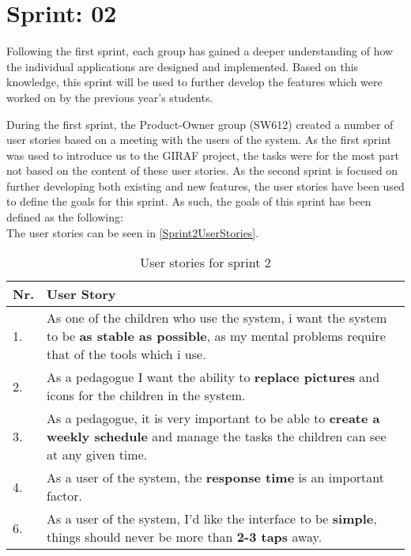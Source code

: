 \chapter{Sprint: 02}
Following the first sprint, each group has gained a deeper understanding of how
the individual applications are designed and implemented. Based on this
knowledge, this sprint will be used to further develop the features which were
worked on by the previous year's students.\nl

During the first sprint, the Product-Owner group (SW612) created a number of
user stories based on a meeting with the users of the system. As the first
sprint was used to introduce us to the GIRAF project, the tasks were for the
most part not based on the content of these user stories. As the second sprint
is focused on further developing both existing and new features, the user
stories have been used to define the goals for this sprint. As such, the goals
of this sprint has been defined as the following:\\
 The user stories can be seen in \autoref{Sprint2UserStories}.


\begin{table}[H]
\centering 
\begin{tabular}{|l|p{12.5cm}|}
\hline
Nr. & User Story \\\hline
1. & As one of the children who use the system, i want the system to be 
\textbf{as stable as possible}, as my mental problems require that of the tools
which i use. \\ \hline
2. & As a pedagogue I want the ability to \textbf{replace pictures} and icons
for the children in the system.\\ \hline
3. & As a pedagogue, it is very important to be able to \textbf{create a weekly
schedule} and manage the tasks the children can see at any given time.\\ \hline
4. & As a user of the system, the \textbf{response time} is an important
factor.\\ \hline
6. & As a user of the system, I'd like the interface to be \textbf{simple},
things should never be more than \textbf{2-3 taps} away. \\\hline
\end{tabular}
\caption{User stories for sprint 2}
\label{Sprint2UserStories}
\end{table}

